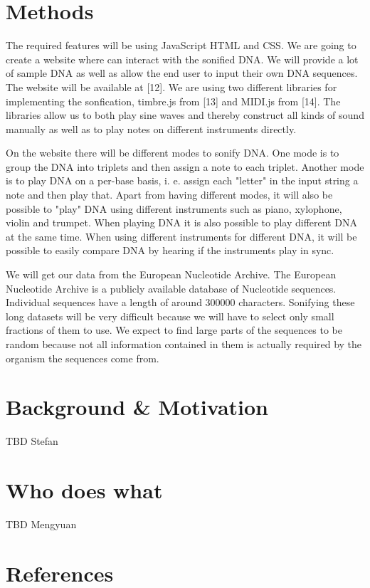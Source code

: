 \documentclass[12pt]{article}
\begin{document}
\section{Methods}

The required features will be using JavaScript HTML and CSS. We are going to create a website where can interact with the sonified DNA. We will provide a lot of sample DNA as well as allow the end user to input their own DNA sequences. The website will be available at [12]. We are using two different libraries for implementing the sonfication, timbre.js from [13] and MIDI.js from [14]. The libraries allow us to both play sine waves and thereby construct all kinds of sound manually as well as to play notes on different instruments directly. 

On the website there will be different modes to sonify DNA. One mode is to group the DNA into triplets and then assign a note to each triplet. Another mode is to play DNA on a per-base basis, i. e. assign each "letter" in the input string a note and then play that. Apart from having different modes, it will also be possible to "play" DNA using different instruments such as piano, xylophone, violin and trumpet. When playing DNA it is also possible to play different DNA at the same time. When using different instruments for different DNA, it will be possible to easily compare DNA by hearing if the instruments play in sync. 

We will get our data from the European Nucleotide Archive. The European Nucleotide Archive is a publicly available database of Nucleotide sequences. Individual sequences have a length of around 300000 characters. Sonifying these long datasets will be very difficult because we will have to select only small fractions of them to use. We expect to find large parts of the sequences to be random because not all information contained in them is actually required by the organism the sequences come from.  

\section{Background \& Motivation}

TBD Stefan

\section{Who does what}

TBD Mengyuan

\section{References}
\end{document}
